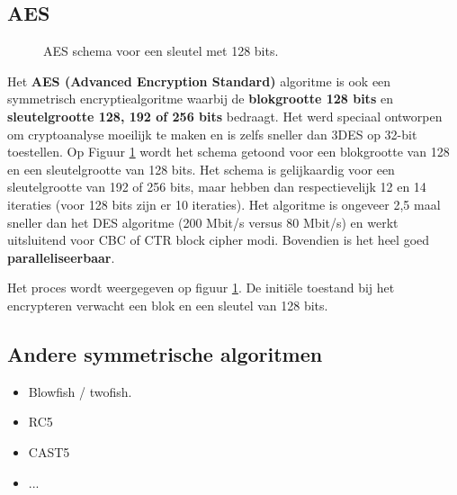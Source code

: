 \documentclass{report}
\begin{document}
	\subsection{AES}
	\begin{figure}[ht]
		\caption{AES schema voor een sleutel met 128 bits.}
		\label{fig:AES}
	\end{figure}

	Het \textbf{AES (Advanced Encryption Standard)} algoritme is ook een symmetrisch encryptiealgoritme waarbij de \textbf{blokgrootte 128 bits} en \textbf{sleutelgrootte 128, 192 of 256 bits} bedraagt. Het werd speciaal ontworpen om cryptoanalyse moeilijk te maken en is zelfs sneller dan 3DES op 32-bit toestellen. Op Figuur \ref{fig:AES} wordt het schema getoond voor een blokgrootte van 128 en een sleutelgrootte van 128 bits. Het schema is gelijkaardig voor een sleutelgrootte van 192 of 256 bits, maar hebben dan respectievelijk 12 en 14 iteraties (voor 128 bits zijn er 10 iteraties). Het algoritme is ongeveer 2,5 maal sneller dan het DES algoritme (200 Mbit/s versus 80 Mbit/s) en werkt uitsluitend voor CBC of CTR block cipher modi. Bovendien is het heel goed \textbf{paralleliseerbaar}. 
	
	Het proces wordt weergegeven op figuur \ref{fig:AES}. De initiële toestand bij het encrypteren verwacht een blok en een sleutel van 128 bits. 	
	\subsection{Andere symmetrische algoritmen}
	\begin{itemize}
		\item[\info] Blowfish / twofish.
		\item[\info] RC5
		\item[\info] CAST5 
		\item[\info]...
	\end{itemize}
\end{document}
